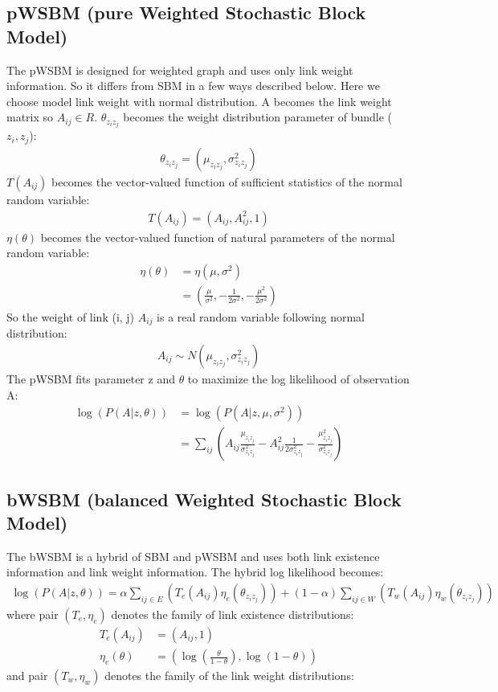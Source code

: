 \documentclass[letterpaper]{article}
\begin{document}
\subsection{pWSBM (pure Weighted Stochastic Block Model)}
The pWSBM is designed for weighted graph and uses only link weight information.
So it differs from SBM in a few ways described below.
Here we choose model link weight with normal distribution.
A becomes the link weight matrix so $ A_{ij} \in R $.
$ \theta_{z_i z_j} $ becomes the weight distribution parameter of bundle ($z_i, z_j$):
\begin{align*}
	\theta_{z_i z_j} = (\mu_{z_i z_j}, \sigma_{z_i z_j}^2)
\end{align*}
$ T(A_{ij}) $ becomes the vector-valued function of sufficient statistics of the normal random variable:
\begin{align*}
	T(A_{ij}) = (A_{ij}, A_{ij}^2, 1)
\end{align*}
$ \eta(\theta) $ becomes the vector-valued function of natural parameters of the normal random variable:
\begin{align*}
	\eta(\theta)
	&= \eta(\mu, \sigma^2)\\
	&= (\frac{\mu}{\sigma^2}, -\frac{1}{2\sigma^2}, -\frac{\mu^2}{2\sigma^2})
\end{align*}
So the weight of link (i, j)  $ A_{ij} $ is a real random variable following normal distribution:
\begin{align*}
	A_{ij} \sim N(\mu_{z_i z_j}, \sigma_{z_i z_j}^2)
\end{align*}
The pWSBM fits parameter z and $ \theta $
to maximize the log likelihood of observation A:
\begin{align*}
\log(P(A|z, \theta))
&= \log(P(A|z, \mu, \sigma^2))\\
&= \sum_{ij} (
A_{ij} \frac{\mu_{z_i z_j}}{\sigma_{z_i z_j}^2}
- A_{ij}^2 \frac{1}{2\sigma_{z_i z_j}^2}
- \frac{\mu_{z_i z_j}^2}{\sigma_{z_i z_j}^2}
)
\end{align*}

\subsection{bWSBM (balanced Weighted Stochastic Block Model)}
The bWSBM is a hybrid of SBM and pWSBM
and uses both link existence information and link weight information.
The hybrid log likelihood becomes:
\begin{align*}
\log(P(A|z, \theta))
= \alpha \sum_{ij \in E} (T_e(A_{ij}) \eta_e(\theta_{z_i z_j}))
+ (1 - \alpha) \sum_{ij \in W} (T_w(A_{ij}) \eta_w(\theta_{z_i z_j}))
\end{align*}
where pair $ (T_e, \eta_e) $ denotes the family of link existence distributions:
\begin{align*}
T_e(A_{ij}) &= (A_{ij}, 1)\\
\eta_e(\theta) &= ( \log(\frac{\theta}{1-\theta}), \log(1-\theta) )
\end{align*}
and pair $ (T_w, \eta_w) $ denotes the family of the link weight distributions:
\end{document}
